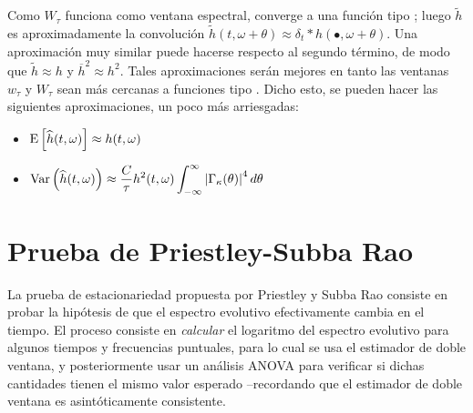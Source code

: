 Como $W_{\tau}$ funciona como ventana espectral, converge a una 
función tipo \dirac; luego $\widetilde{h}$ es aproximadamente la convolución 
$\widetilde{h}(t,\omega+\theta) \approx \delta_t \ast h(\bullet,\omega+\theta)$. 
Una aproximación muy similar 
puede hacerse respecto al segundo término, de modo que $\widetilde{h}\approx h$ y 
$\overline{h}^{2}\approx h^{2}$.
Tales aproximaciones serán mejores en tanto las ventanas $w_{\tau}$ y $W_{\tau}$ sean más 
cercanas a funciones tipo \dirac.
Dicho esto, se pueden hacer las siguientes aproximaciones, un poco más arriesgadas:
\begin{itemize}
\item $\displaystyle \mathrm{E}\left[ \widehat{ h }(t,\omega) \right] \approx h(t,\omega)$
\item $\displaystyle \mathrm{Var}\left( \widehat{ h }(t,\omega) \right) \approx 
\frac{C}{\tau} h^{2}(t,\omega) \int_{-\infty}^{\infty} \left| \Gamma_\kappa (\theta) \right|^{4} d\theta$
\end{itemize}


\section{Prueba de Priestley-Subba Rao}

La prueba de estacionariedad propuesta por Priestley y Subba Rao \cite{Priestley69} consiste en 
probar la hipótesis de que el espectro evolutivo efectivamente cambia en el tiempo. 
%
El proceso consiste en \textit{calcular} el logaritmo del espectro evolutivo para algunos tiempos y 
frecuencias puntuales, para lo cual se usa el estimador de doble ventana, y posteriormente usar un
análisis ANOVA para verificar si dichas cantidades tienen el mismo valor esperado --recordando que
el estimador de doble ventana es asintóticamente consistente.

